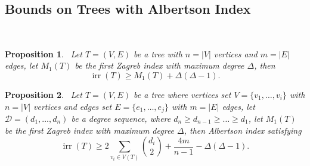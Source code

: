 \documentclass[12pt]{amsart}
\newcommand{\irr}{\operatorname{irr}}
\newtheorem{proposition}{Proposition}[section]
\begin{document}
\subsection{Bounds on Trees with Albertson Index}~\label{subsec1}
\begin{proposition}~\label{prozagn1}
Let $T=(V,E)$ be a tree with $n=|V|$ vertices and $m=|E|$ edges, let $M_1(T)$ be the first Zagreb index with maximum degree $\Delta$, then
\[
\irr(T)\geq M_1(T)+\Delta(\Delta-1).
\]
\end{proposition}
\begin{proposition}~\label{prozagn2}
Let $T=(V,E)$ be a tree where vertices set $V=\{v_1,\dots,v_i\}$ with $n=|V|$ vertices and edges set $E=\{e_1,\dots,e_j\}$ with $m=|E|$ edges, let $\mathscr{D}=(d_1,\dots,d_n)$ be a degree sequence, where $d_n\geqslant d_{n-1}\geqslant \dots \geqslant d_1$, let $M_1(T)$ be the first Zagreb index with maximum degree $\Delta$, then Albertson index satisfying 
\[\irr(T)\geqslant 2\sum_{v_i\in V(T)}\binom{d_i}{2}+\frac{4m}{n-1}-\Delta(\Delta-1).\]
\end{proposition}
\end{document}
